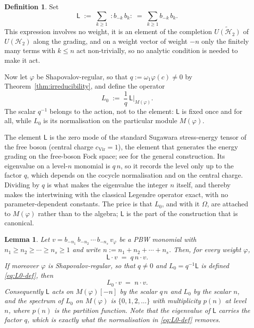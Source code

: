 \documentclass[12pt]{amsart}
\theoremstyle{plain}
\newtheorem{lemma}[theorem]{Lemma}
\theoremstyle{definition}
\newtheorem{definition}[theorem]{Definition}
\newcommand{\Lalg}{{\mathsf{L}}}
\newcommand{\Mf}{M(\varphi)}          %
\newcommand{\vf}{v_\varphi}           %
\newcommand{\Om}{\Omega}              %
\begin{document}
\begin{definition}
\label{def:L0}
Set
\begin{equation}\label{eq:Lalg}
  \Lalg \;:=\; \sum_{k\geq 1}\;{:}b_{-k}\,b_k{:}
        \;=\; \sum_{k\geq 1} b_{-k}\,b_k .
\end{equation}
This expression
involves no weight, it is an element of the completion
$\widetilde{U(\mathcal{H}_2)}$ of $U(\mathcal{H}_2)$ along the grading,
and on a weight vector of weight $-n$ only the finitely many terms with
$k\le n$ act non-trivially, so no analytic condition is needed to make
it act.

Now let $\varphi$ be Shapovalov-regular, so that
$q := \omega_1\varphi(c) \neq 0$ by
Theorem~\ref{thm:irreducibility}, and define the operator
\begin{equation}\label{eq:L0-def}
  L_0 \;:=\; \frac{1}{q}\,\Lalg \Big|_{\Mf} .
\end{equation}
The scalar $q^{-1}$ belongs to the action, not to the element: $\Lalg$
is fixed once and for all, while $L_0$ is its normalisation on the
particular module $\Mf$.
\end{definition}

The element $\Lalg$ is the zero mode of the standard Sugawara
stress-energy tensor of the free boson (central charge
$c_{\mathrm{Vir}}=1$), the element that generates the energy grading on
the free-boson Fock space; see \cite{KacWakimoto1988,FrenkelBenZvi} for
the general construction. Its eigenvalue on a level-$n$ monomial is
$q\,n$, so it records the level only up to the factor $q$, which depends
on the cocycle normalisation and on the central charge. Dividing by $q$
is what makes the eigenvalue the integer $n$ itself, and thereby makes
the intertwining with the classical Legendre operator exact, with no
parameter-dependent constants. The price is that $L_0$, and with it
$\Om$, are attached to $\Mf$ rather than to the algebra; $\Lalg$ is the
part of the construction that is canonical.

\begin{lemma}
\label{lem:L0-level}
Let $v = b_{-n_1}\,b_{-n_2}\,\cdots\,b_{-n_s}\,\vf$ be a PBW monomial
with $n_1\geq n_2\geq\cdots\geq n_s\geq 1$ and write
$n := n_1 + n_2 + \cdots + n_s$. Then, for \emph{every} weight
$\varphi$,
\begin{equation}\label{eq:L0-level}
  \Lalg \cdot v \;=\; q\,n\cdot v .
\end{equation}
If moreover $\varphi$ is Shapovalov-regular, so that $q \neq 0$ and
$L_0 = q^{-1}\Lalg$ is defined \eqref{eq:L0-def}, then
\begin{equation}\label{eq:L0-level-normalised}
  L_0 \cdot v \;=\; n\cdot v .
\end{equation}
Consequently $\Lalg$ acts on $\Mf[-n]$ by the scalar $q\,n$ and $L_0$ by
the scalar $n$, and the spectrum of $L_0$ on $\Mf$ is $\{0,1,2,\dots\}$
with multiplicity $p(n)$ at level $n$, where $p(n)$ is the partition
function. Note that the eigenvalue of $\Lalg$ carries the factor $q$,
which is exactly what the normalisation in \eqref{eq:L0-def} removes.
\end{lemma}
\end{document}
